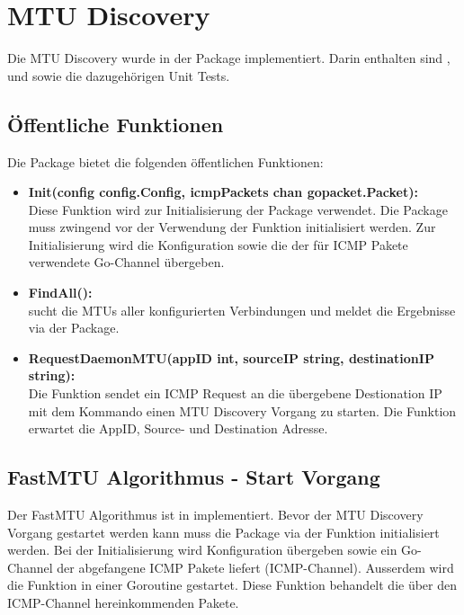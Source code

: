 \section{MTU Discovery}
\label{sec:MTU Discovery}

Die \ac{MTU} Discovery wurde in der  Package implementiert. Darin enthalten sind ,  und  sowie die dazugehörigen Unit Tests.

\subsection{Öffentliche Funktionen}
Die  Package bietet die folgenden öffentlichen Funktionen:

\begin{itemize}
\item \textbf{Init(config config.Config, icmpPackets chan gopacket.Packet):} \\
Diese Funktion wird zur Initialisierung der  Package verwendet. Die Package muss zwingend vor der Verwendung der  Funktion initialisiert werden. Zur Initialisierung wird die Konfiguration sowie die der für \ac{ICMP} Pakete verwendete Go-Channel übergeben.
\item \textbf{FindAll():} \\
 sucht die \ac{MTU}s aller konfigurierten Verbindungen und meldet die Ergebnisse via der  Package.
\item \textbf{RequestDaemonMTU(appID int, sourceIP string, destinationIP string):} \\
Die Funktion  sendet ein ICMP Request an die übergebene Destionation IP mit dem Kommando einen \ac{MTU} Discovery Vorgang zu starten. Die Funktion erwartet die AppID, Source- und Destination Adresse.
\end{itemize}

\subsection{FastMTU Algorithmus - Start Vorgang}
Der FastMTU Algorithmus ist in  implementiert. Bevor der \ac{MTU} Discovery Vorgang gestartet werden kann muss die  Package via der  Funktion initialisiert werden. Bei der Initialisierung wird Konfiguration übergeben sowie ein Go-Channel der abgefangene \ac{ICMP} Pakete liefert (ICMP-Channel). Ausserdem wird die Funktion  in einer Goroutine gestartet. Diese Funktion behandelt die über den ICMP-Channel hereinkommenden Pakete.

